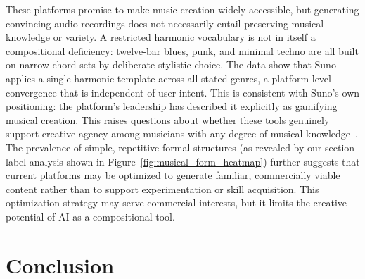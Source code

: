 \documentclass{article}
\begin{document}
These platforms promise to make music creation widely accessible, but generating convincing audio recordings does not necessarily entail preserving musical knowledge or variety. A restricted harmonic vocabulary is not in itself a compositional deficiency: twelve-bar blues, punk, and minimal techno are all built on narrow chord sets by deliberate stylistic choice. The data show that Suno applies a single harmonic template across all stated genres, a platform-level convergence that is independent of user intent. This is consistent with Suno's own positioning: the platform's leadership has described it explicitly as gamifying musical creation. This raises questions about whether these tools genuinely support creative agency among musicians with any degree of musical knowledge~\citep{wiggins2007compositional, wiggins2016musical, lin2023promptsexploringdesignspace, tan2024we}. The prevalence of simple, repetitive formal structures (as revealed by our section-label analysis shown in Figure~\ref{fig:musical_form_heatmap}) further suggests that current platforms may be optimized to generate familiar, commercially viable content rather than to support experimentation or skill acquisition. This optimization strategy may serve commercial interests, but it limits the creative potential of AI as a compositional tool.




\section{Conclusion}
\label{sec:conclusion}
\end{document}

